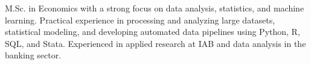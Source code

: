M.Sc. in Economics with a strong focus on data analysis, statistics, and machine learning. Practical experience in processing and analyzing large datasets, statistical modeling, and developing automated data pipelines using Python, R, SQL, and Stata. Experienced in applied research at IAB and data analysis in the banking sector.
